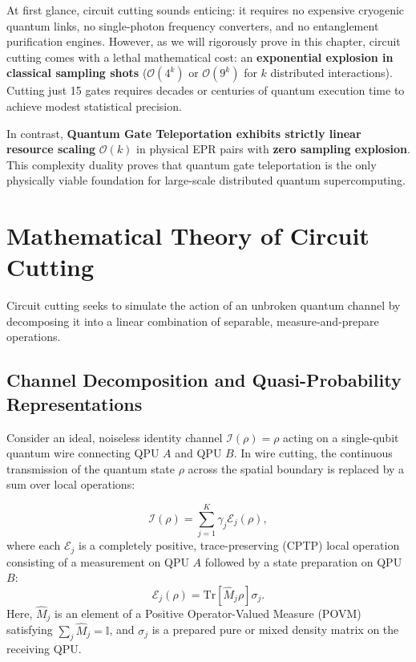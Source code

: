 At first glance, circuit cutting sounds enticing: it requires no expensive cryogenic quantum links, no single-photon frequency converters, and no entanglement purification engines. However, as we will rigorously prove in this chapter, circuit cutting comes with a lethal mathematical cost: an \textbf{exponential explosion in classical sampling shots} ($\mathcal{O}(4^k)$ or $\mathcal{O}(9^k)$ for $k$ distributed interactions). Cutting just 15 gates requires decades or centuries of quantum execution time to achieve modest statistical precision.

In contrast, \textbf{Quantum Gate Teleportation exhibits strictly linear resource scaling} $\mathcal{O}(k)$ in physical EPR pairs with \textbf{zero sampling explosion}. This complexity duality proves that quantum gate teleportation is the only physically viable foundation for large-scale distributed quantum supercomputing.

\section{Mathematical Theory of Circuit Cutting}
\label{sec:circuit_cutting_math}

Circuit cutting seeks to simulate the action of an unbroken quantum channel by decomposing it into a linear combination of separable, measure-and-prepare operations.

\subsection{Channel Decomposition and Quasi-Probability Representations}
Consider an ideal, noiseless identity channel $\mathcal{I}(\rho) = \rho$ acting on a single-qubit quantum wire connecting QPU $A$ and QPU $B$. In wire cutting, the continuous transmission of the quantum state $\rho$ across the spatial boundary is replaced by a sum over local operations:

\begin{equation}
    \mathcal{I}(\rho) = \sum_{j=1}^{K} \gamma_j \mathcal{E}_j(\rho),
    \label{eq:channel_decomp_full}
\end{equation}
where each $\mathcal{E}_j$ is a completely positive, trace-preserving (CPTP) local operation consisting of a measurement on QPU $A$ followed by a state preparation on QPU $B$:
\begin{equation}
    \mathcal{E}_j(\rho) = \text{Tr}\left[ \hat{M}_j \rho \right] \sigma_j.
    \label{eq:measure_prepare_op_full}
\end{equation}
Here, $\hat{M}_j$ is an element of a Positive Operator-Valued Measure (POVM) satisfying $\sum_j \hat{M}_j = \mathbb{I}$, and $\sigma_j$ is a prepared pure or mixed density matrix on the receiving QPU.


